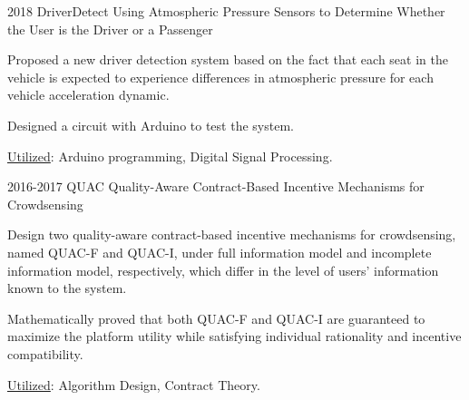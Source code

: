 \begin{cventries}
	
	\cvprojectentry
	{2018 DriverDetect}
	{Using Atmospheric Pressure Sensors to Determine Whether the User is the Driver or a Passenger}
	{
		\begin{cvitems} %
			\item Proposed a new driver detection system based on the fact that each seat in the vehicle is expected to experience differences in atmospheric pressure for each vehicle acceleration dynamic. 
			\item Designed a circuit with Arduino to test the system. 
			\item \underline{Utilized}: Arduino programming, Digital Signal Processing.
		\end{cvitems}
	}
	
	
	
	
	
	\cvprojectentry
	{2016-2017 QUAC}
	{Quality-Aware Contract-Based Incentive Mechanisms for Crowdsensing}
	{
		\begin{cvitems} %
			\item Design two quality-aware contract-based incentive mechanisms for crowdsensing, named QUAC-F and QUAC-I, under full information model and incomplete information model, respectively, which differ in the level of users’ information known to the system.
			\item Mathematically proved that both QUAC-F and QUAC-I are guaranteed to maximize the platform utility while satisfying individual rationality and incentive compatibility.
			\item  \underline{Utilized}: Algorithm Design, Contract Theory.
		\end{cvitems}
	}
	
	

\end{cventries}
